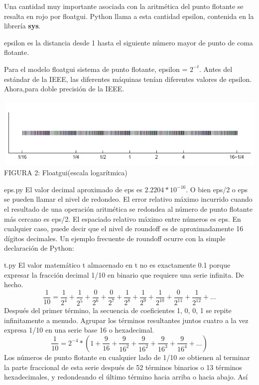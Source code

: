 \documentclass[12pt]{article}
\begin{document}
Una cantidad muy importante asociada con la aritmética del punto flotante se resalta en rojo
por floatgui. Python llama a esta cantidad epsilon, contenida en la librer\'ia \textbf{sys}.
\begin{center}
epsilon es la distancia desde 1 hasta el siguiente número mayor de punto de coma flotante.
\end{center}
Para el modelo floatgui sistema de punto flotante, epsilon = $2^{-t}$.
Antes del estándar de la IEEE, las diferentes máquinas tenían diferentes valores de epsilon. Ahora,para doble precisión de la IEEE.
\begin{center}
  \includegraphics[scale=0.65]{fig2}
  FIGURA 2: Floatgui(escala logar\'itmica)\\
\end{center}

{eps.py}
El valor decimal aproximado de eps es $2.2204*10^{-16}$. O bien eps/2 o eps se pueden
llamar el nivel de redondeo. El error relativo máximo incurrido cuando el resultado de una
operación aritmética se redondea al número de punto flotante más cercano es eps/2. El
espaciado relativo máximo entre números es eps. En cualquier caso, puede decir que el nivel
de roundoff es de aproximadamente 16 dígitos decimales.
Un ejemplo frecuente de roundoff ocurre con la simple declaración de Python:

{t.py}
El valor matemático t almacenado en t no es exactamente 0.1 porque expresar la fracción
decimal 1/10 en binario que requiere una serie infinita. De hecho.
$$\frac{1}{10} = \frac{1}{2^4} + \frac{1}{2^5} + \frac{0}{2^6} + \frac{0}{2^7} + \frac{1}{2^8} + \frac{1}{2^9} + \frac{1}{2^{10}} + \frac{0}{2^{11}}+ \frac{1}{2^{12}}+ ...$$
Después del primer término, la secuencia de coeficientes 1, 0, 0, 1 se repite infinitamente a
menudo. Agrupar los términos resultantes juntos cuatro a la vez expresa 1/10 en una serie
base 16 o hexadecimal.
$$\frac{1}{10} = 2^{-4}*(1+\frac{9}{16}+\frac{9}{16^2}+\frac{9}{16^2}+\frac{9}{16^3}+\frac{9}{16^4}+...)$$
Los números de punto flotante en cualquier lado de 1/10 se obtienen al terminar la parte
fraccional de esta serie después de 52 términos binarios o 13 términos hexadecimales, y
redondeando el último término hacia arriba o hacia abajo. Así
\end{document}
